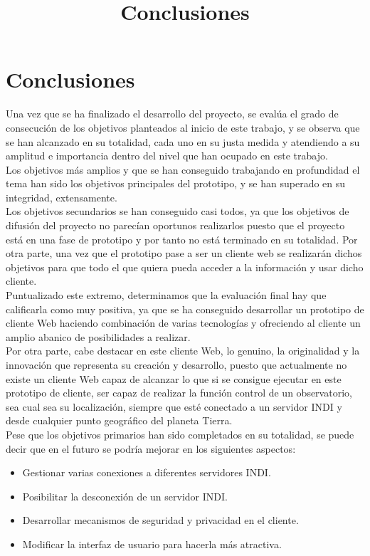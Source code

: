 \chapter{Conclusiones}
\title{Conclusiones}
\label{cap:Conclusiones}

Una vez que se ha finalizado el desarrollo del proyecto, se evalúa el grado de consecución de los objetivos planteados  al inicio de este trabajo, y se observa que se han alcanzado en su totalidad, cada uno en su justa medida y atendiendo a su amplitud e importancia dentro del nivel que han ocupado en este trabajo. \\

Los objetivos más amplios y que se han conseguido trabajando en profundidad el tema han sido los objetivos principales del prototipo, y se han superado en su integridad, extensamente.\\

Los objetivos secundarios se han conseguido casi todos, ya que los objetivos de difusión del proyecto no parecían oportunos realizarlos puesto que el proyecto está en una fase de prototipo y por tanto no está terminado en su totalidad. Por otra parte, una vez que el prototipo pase a ser un cliente web se realizarán dichos objetivos para que todo el que quiera pueda acceder a la información y usar dicho cliente.\\

Puntualizado este extremo, determinamos que la evaluación final hay que calificarla como muy positiva, ya que se ha conseguido desarrollar un prototipo de cliente Web haciendo combinación de varias tecnologías y ofreciendo al cliente un amplio abanico de posibilidades a realizar.\\

Por otra parte, cabe destacar en este cliente Web, lo genuino, la originalidad y la innovación que representa su creación y desarrollo, puesto que actualmente no existe un cliente Web capaz de alcanzar lo que si se consigue ejecutar en este prototipo de cliente, ser  capaz de realizar la función control de un observatorio, sea cual sea su localización, siempre que esté conectado a un servidor INDI y desde cualquier punto geográfico del planeta Tierra.\\

Pese que los objetivos primarios han sido completados en su totalidad, se puede decir que en el futuro se podría mejorar en los siguientes aspectos:
\begin{itemize}
  \item Gestionar varias conexiones a diferentes servidores INDI.
  \item Posibilitar la desconexión de un servidor INDI.
  \item Desarrollar mecanismos de seguridad y privacidad en el cliente.
  \item Modificar la interfaz de usuario para hacerla más atractiva.
\end{itemize}

